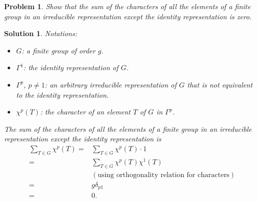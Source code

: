 \documentclass[UTF8,10pt,a4paper]{article}
\theoremstyle{Problem}
\newtheorem{prob}{Problem}
\theoremstyle{Solution}
\newtheorem*{sol}{Solution}
\begin{document}
\begin{prob}
    Show that the sum of the characters of all the elements of a finite group in an irreducible representation except the identity representation is zero.
\end{prob}
\begin{sol}
    Notations:
    \begin{itemize}
        \item $G$: a finite group of order $g$.
        \item $\Gamma^1$: the identity representation of $G$.
        \item $\Gamma^p$, $p\neq 1$: an arbitrary irreducible representation of $G$ that is not equivalent to the identity representation.
        \item $\chi^p(T)$: the character of an element $T$ of $G$ in $\Gamma^p$.
    \end{itemize}
    The sum of the characters of all the elements of a finite group in an irreducible representation except the identity representation is
    \begin{align}
        \nonumber\sum_{T\in G}\chi^p(T)=&\sum_{T\in G}\chi^p(T)\cdot 1\\
        \nonumber=&\sum_{T\in G}\chi^p(T)\chi^1(T)\\
        \nonumber&(\text{using orthogonality relation for characters})\\
        \nonumber=&g\delta_{p1}\\
        =&0.
    \end{align}
\end{sol}
\end{document}
